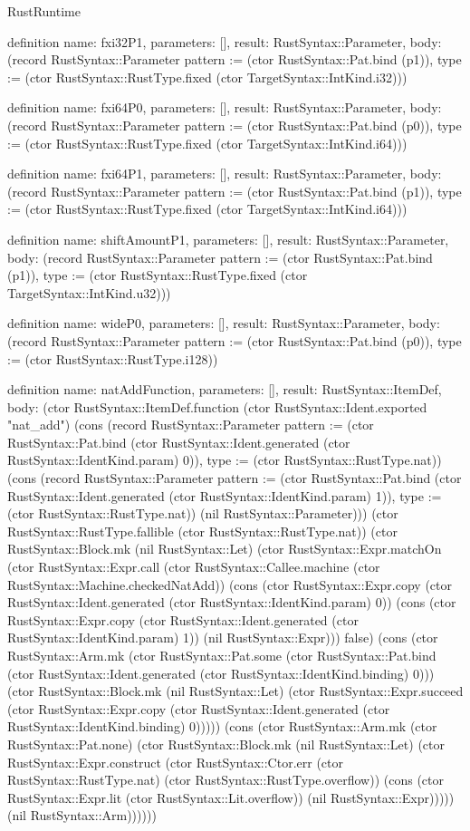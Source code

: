 \begin{lexlean}{RustRuntime}
\begin{semanticmodule}
definition{
  name: fxi32P1,
  parameters: [],
  result: RustSyntax::Parameter,
  body: (record RustSyntax::Parameter {pattern := (ctor RustSyntax::Pat.bind (p1)), type := (ctor RustSyntax::RustType.fixed (ctor TargetSyntax::IntKind.i32))})
}

definition{
  name: fxi64P0,
  parameters: [],
  result: RustSyntax::Parameter,
  body: (record RustSyntax::Parameter {pattern := (ctor RustSyntax::Pat.bind (p0)), type := (ctor RustSyntax::RustType.fixed (ctor TargetSyntax::IntKind.i64))})
}

definition{
  name: fxi64P1,
  parameters: [],
  result: RustSyntax::Parameter,
  body: (record RustSyntax::Parameter {pattern := (ctor RustSyntax::Pat.bind (p1)), type := (ctor RustSyntax::RustType.fixed (ctor TargetSyntax::IntKind.i64))})
}

definition{
  name: shiftAmountP1,
  parameters: [],
  result: RustSyntax::Parameter,
  body: (record RustSyntax::Parameter {pattern := (ctor RustSyntax::Pat.bind (p1)), type := (ctor RustSyntax::RustType.fixed (ctor TargetSyntax::IntKind.u32))})
}

definition{
  name: wideP0,
  parameters: [],
  result: RustSyntax::Parameter,
  body: (record RustSyntax::Parameter {pattern := (ctor RustSyntax::Pat.bind (p0)), type := (ctor RustSyntax::RustType.i128)})
}

definition{
  name: natAddFunction,
  parameters: [],
  result: RustSyntax::ItemDef,
  body: (ctor RustSyntax::ItemDef.function (ctor RustSyntax::Ident.exported "nat_add") (cons (record RustSyntax::Parameter {pattern := (ctor RustSyntax::Pat.bind (ctor RustSyntax::Ident.generated (ctor RustSyntax::IdentKind.param) 0)), type := (ctor RustSyntax::RustType.nat)}) (cons (record RustSyntax::Parameter {pattern := (ctor RustSyntax::Pat.bind (ctor RustSyntax::Ident.generated (ctor RustSyntax::IdentKind.param) 1)), type := (ctor RustSyntax::RustType.nat)}) (nil RustSyntax::Parameter))) (ctor RustSyntax::RustType.fallible (ctor RustSyntax::RustType.nat)) (ctor RustSyntax::Block.mk (nil RustSyntax::Let) (ctor RustSyntax::Expr.matchOn (ctor RustSyntax::Expr.call (ctor RustSyntax::Callee.machine (ctor RustSyntax::Machine.checkedNatAdd)) (cons (ctor RustSyntax::Expr.copy (ctor RustSyntax::Ident.generated (ctor RustSyntax::IdentKind.param) 0)) (cons (ctor RustSyntax::Expr.copy (ctor RustSyntax::Ident.generated (ctor RustSyntax::IdentKind.param) 1)) (nil RustSyntax::Expr))) false) (cons (ctor RustSyntax::Arm.mk (ctor RustSyntax::Pat.some (ctor RustSyntax::Pat.bind (ctor RustSyntax::Ident.generated (ctor RustSyntax::IdentKind.binding) 0))) (ctor RustSyntax::Block.mk (nil RustSyntax::Let) (ctor RustSyntax::Expr.succeed (ctor RustSyntax::Expr.copy (ctor RustSyntax::Ident.generated (ctor RustSyntax::IdentKind.binding) 0))))) (cons (ctor RustSyntax::Arm.mk (ctor RustSyntax::Pat.none) (ctor RustSyntax::Block.mk (nil RustSyntax::Let) (ctor RustSyntax::Expr.construct (ctor RustSyntax::Ctor.err (ctor RustSyntax::RustType.nat) (ctor RustSyntax::RustType.overflow)) (cons (ctor RustSyntax::Expr.lit (ctor RustSyntax::Lit.overflow)) (nil RustSyntax::Expr))))) (nil RustSyntax::Arm))))))
}


\end{semanticmodule}
\end{lexlean}
